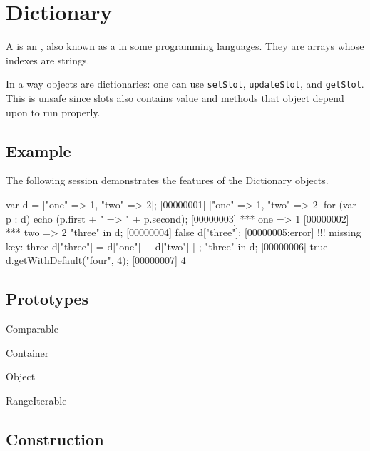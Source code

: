
\section{Dictionary}

A  is an , also known as a
 in some programming languages.  They are arrays whose
indexes are strings.

In a way objects are dictionaries: one can use \lstinline|setSlot|,
\lstinline|updateSlot|, and \lstinline|getSlot|.  This is unsafe since
slots also contains value and methods that object depend upon to run
properly.

\subsection{Example}

The following session demonstrates the features of the Dictionary
objects.

\begin{urbiscript}[firstnumber=1]
var d = ["one" => 1, "two" => 2];
[00000001] ["one" => 1, "two" => 2]
for (var p : d)
  echo (p.first + " => " + p.second);
[00000003] *** one => 1
[00000002] *** two => 2
"three" in d;
[00000004] false
d["three"];
[00000005:error] !!! missing key: three
d["three"] = d["one"] + d["two"] | {};
"three" in d;
[00000006] true
d.getWithDefault("four", 4);
[00000007] 4
\end{urbiscript}

\subsection{Prototypes}

\begin{refObjects}
\item[Comparable]
\item[Container]
\item[Object]
\item[RangeIterable]
\end{refObjects}

\subsection{Construction}

